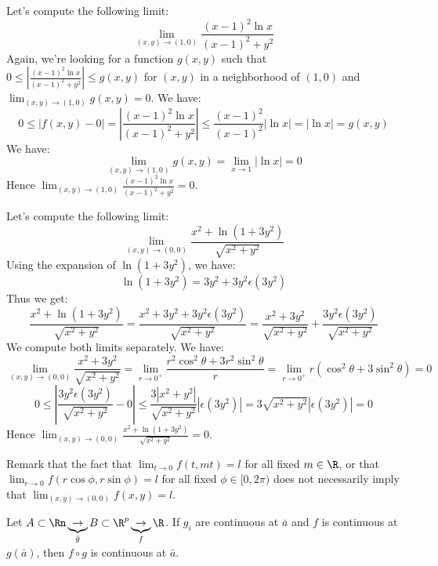 \begin{eg}
    Let's compute the following limit:
    \[
        \lim_{(x,y) \to (1,0)} \frac{(x-1)^2 \ln x}{(x-1)^2 + y^2}
    \]
    Again, we're looking for a function $g(x,y)$ such that $0 \leq \left|\frac{(x-1)^2 \ln x}{(x-1)^2 + y^2}\right| \leq g(x,y)$ for $(x,y)$ in a neighborhood of $(1,0)$ and $\lim_{(x,y) \to (1,0)} g(x,y) = 0$. We have:
    \[
        0 \leq |f(x,y) - 0| = \left|\frac{(x-1)^2 \ln x}{(x-1)^2 + y^2}\right| \leq \frac{(x-1)^2}{(x-1)^2} |\ln x| = |\ln x| = g(x,y)
    \]
    We have:
    \[
        \lim_{(x,y) \to (1,0)} g(x,y) = \lim_{x \to 1} |\ln x| = 0
    \]
    Hence $\lim_{(x,y) \to (1,0)} \frac{(x-1)^2 \ln x}{(x-1)^2 + y^2} = 0$.
\end{eg}

\begin{eg}
    Let's compute the following limit:
    \[
        \lim_{(x,y) \to (0,0)} \frac{x^2 + \ln (1 + 3y^2)}{\sqrt{x^2 + y^2}}
    \]
    Using the expansion of $\ln (1 + 3y^2)$, we have:
    \[
        \ln (1 + 3y^2) = 3y^2 + 3y^2 \epsilon(3y^2)
    \]
    Thus we get:
    \[
        \frac{x^2 + \ln (1 + 3y^2)}{\sqrt{x^2 + y^2}} = \frac{x^2 + 3y^2 + 3y^2 \epsilon(3y^2)}{\sqrt{x^2 + y^2}} = \frac{x^2 + 3y^2}{\sqrt{x^2 + y^2}} + \frac{3y^2 \epsilon(3y^2)}{\sqrt{x^2 + y^2}}
    \]
    We compute both limits separately. We have:
    \[
        \lim_{(x,y) \to (0,0)} \frac{x^2 + 3y^2}{\sqrt{x^2 + y^2}} = \lim_{r \to 0^+} \frac{r^2 \cos^2 \theta + 3r^2 \sin^2 \theta}{r} = \lim_{r \to 0^+} r (\cos^2 \theta + 3 \sin^2 \theta) = 0
    \]
    \[
        0 \leq \left| \frac{3y^2 \epsilon(3y^2)}{\sqrt{x^2 + y^2}} - 0 \right| \leq \frac{3 |x^2 + y^2|}{\sqrt{x^2 + y^2}} | \epsilon(3y^2)| = 3 \sqrt{x^2 + y^2} |\epsilon(3y^2)| = 0
    \]
    Hence $\lim_{(x,y) \to (0,0)} \frac{x^2 + \ln (1 + 3y^2)}{\sqrt{x^2 + y^2}} = 0$.
\end{eg}
Remark that the fact that $\lim_{t \to 0} f(t,mt) = l$ for all fixed $m \in \R$, or that $\lim_{r \to 0} f(r \cos \phi, r \sin \phi) = l$ for all fixed $\phi \in [0,2\pi)$ does not necessarily imply that $\lim_{(x,y) \to (0,0)} f(x,y) = l$.

\begin{theorem}
    Let $A \subset \Rn \underbrace{\to}_{\bar{g}} B \subset \R^p \underbrace{\to}_{f} \R$. If $g_i$ are continuous at $\bar{a}$ and $f$ is continuous at $g(\bar{a})$, then $f \circ g$ is continuous at $\bar{a}$.
\end{theorem}

